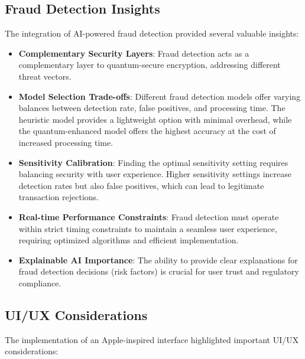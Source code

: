 \documentclass[conference]{IEEEtran}
\begin{document}
\subsection{Fraud Detection Insights}
The integration of AI-powered fraud detection provided several valuable insights:

\begin{itemize}
    \item \textbf{Complementary Security Layers}: Fraud detection acts as a complementary layer to quantum-secure encryption, addressing different threat vectors.
    
    \item \textbf{Model Selection Trade-offs}: Different fraud detection models offer varying balances between detection rate, false positives, and processing time. The heuristic model provides a lightweight option with minimal overhead, while the quantum-enhanced model offers the highest accuracy at the cost of increased processing time.
    
    \item \textbf{Sensitivity Calibration}: Finding the optimal sensitivity setting requires balancing security with user experience. Higher sensitivity settings increase detection rates but also false positives, which can lead to legitimate transaction rejections.
    
    \item \textbf{Real-time Performance Constraints}: Fraud detection must operate within strict timing constraints to maintain a seamless user experience, requiring optimized algorithms and efficient implementation.
    
    \item \textbf{Explainable AI Importance}: The ability to provide clear explanations for fraud detection decisions (risk factors) is crucial for user trust and regulatory compliance.
\end{itemize}

\subsection{UI/UX Considerations}
The implementation of an Apple-inspired interface highlighted important UI/UX considerations:
\end{document}
